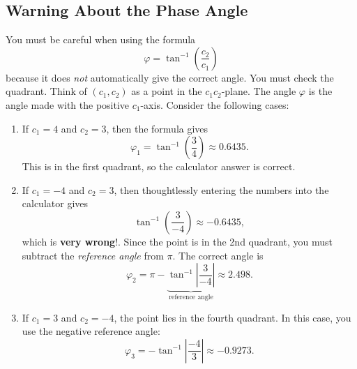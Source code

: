 \documentclass[10pt,letterpaper]{article}
\begin{document}
\subsection{Warning About the Phase Angle}

You must be careful when using the formula
\[
\varphi = \tan^{-1}\!\left(\frac{c_2}{c_1}\right)
\]
because it does \emph{not} automatically give the correct angle. You must check the quadrant. Think of $(c_1, c_2)$ as a point in the $c_1c_2$-plane. The angle $\varphi$ is the angle made with the positive $c_1$-axis. Consider the following cases:
\begin{enumerate}
    \item If $c_1=4$ and $c_2=3$, then the formula gives
    \[
    \varphi_1 = \tan^{-1}\!\left(\frac{3}{4}\right) \approx 0.6435.
    \]
    This is in the first quadrant, so the calculator answer is correct.

    \item If $c_1=-4$ and $c_2=3$, then thoughtlessly entering the numbers into the calculator gives 
    \[
    \tan^{-1}\!\left(\frac{3}{-4}\right)
     \approx -0.6435,
    \]
    which is \textbf{very wrong}!. Since the point is in the 2nd quadrant, you must subtract the \textit{reference angle} from $\pi$. The correct angle is
    \[
    \varphi_2 = \pi - \underbrace{\tan^{-1}\!\left|\frac{3}{-4}\right|}_{\text{reference angle}}
    \approx 2.498.
    \]

    \item If $c_1=3$ and $c_2=-4$, the point lies in the fourth quadrant. In this case, you use the negative reference angle:
    \[
    \varphi_3 = -\tan^{-1}\!\left|\frac{-4}{3}\right|\approx -0.9273.
    \]
\end{enumerate}
\end{document}
